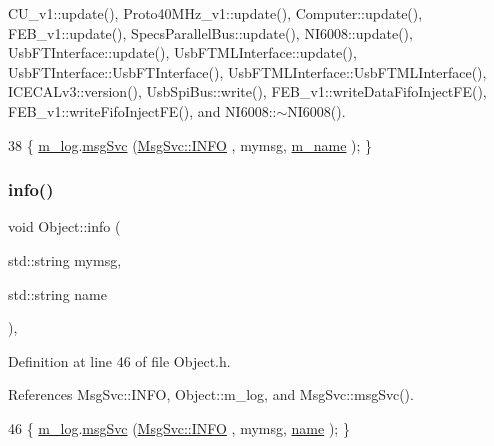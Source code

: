 C\+U\+\_\+v1\+::update(), Proto40\+M\+Hz\+\_\+v1\+::update(), Computer\+::update(), F\+E\+B\+\_\+v1\+::update(), Specs\+Parallel\+Bus\+::update(), N\+I6008\+::update(), Usb\+F\+T\+Interface\+::update(), Usb\+F\+T\+M\+L\+Interface\+::update(), Usb\+F\+T\+Interface\+::\+Usb\+F\+T\+Interface(), Usb\+F\+T\+M\+L\+Interface\+::\+Usb\+F\+T\+M\+L\+Interface(), I\+C\+E\+C\+A\+Lv3\+::version(), Usb\+Spi\+Bus\+::write(), F\+E\+B\+\_\+v1\+::write\+Data\+Fifo\+Inject\+F\+E(), F\+E\+B\+\_\+v1\+::write\+Fifo\+Inject\+F\+E(), and N\+I6008\+::$\sim$\+N\+I6008().


\begin{DoxyCode}
38 \{ \hyperlink{classObject_a0d269813dd7ac1f24bc143031e2963f2}{m\_log}.\hyperlink{classMsgSvc_ad25f18047920cc59a314e5098259711c}{msgSvc} (\hyperlink{classMsgSvc_ae671eb7301996cd049d2da8a65925926ad2fcf3f3e734fc41ee097cc23670ce51}{MsgSvc::INFO}    , mymsg, \hyperlink{classObject_a8b83c95c705d2c3ba0d081fe1710f48d}{m\_name} ); \}
\end{DoxyCode}
\mbox{\label{classObject_a1ca123253dfd30fc28b156f521dcbdae}} 
\subsubsection{\texorpdfstring{info()}{info()}\hspace{0.1cm}{\footnotesize\ttfamily [2/2]}}
{\footnotesize\ttfamily void Object\+::info (\begin{DoxyParamCaption}\item[{std\+::string}]{mymsg,  }\item[{std\+::string}]{name }\end{DoxyParamCaption})\hspace{0.3cm}{\ttfamily [inline]}, {\ttfamily [inherited]}}



Definition at line 46 of file Object.\+h.



References Msg\+Svc\+::\+I\+N\+FO, Object\+::m\+\_\+log, and Msg\+Svc\+::msg\+Svc().


\begin{DoxyCode}
46 \{ \hyperlink{classObject_a0d269813dd7ac1f24bc143031e2963f2}{m\_log}.\hyperlink{classMsgSvc_ad25f18047920cc59a314e5098259711c}{msgSvc} (\hyperlink{classMsgSvc_ae671eb7301996cd049d2da8a65925926ad2fcf3f3e734fc41ee097cc23670ce51}{MsgSvc::INFO}    , mymsg, \hyperlink{classObject_a300f4c05dd468c7bb8b3c968868443c1}{name} ); \}
\end{DoxyCode}
\mbox{\label{classA3PE_abe07bae8ce2f32926b7258f269ae655e}} 

